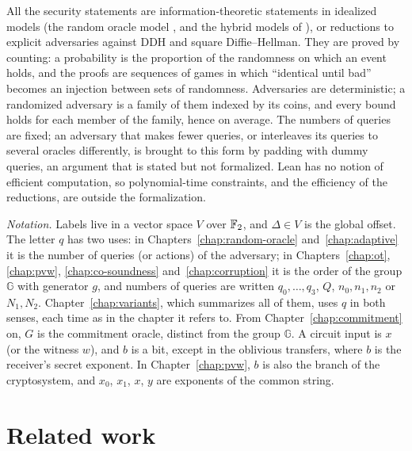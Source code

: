 All the security statements are information-theoretic statements in idealized models (the random
oracle model \cite{BR93}, and the hybrid models of \cite{JKO13}), or reductions to explicit
adversaries against DDH and square Diffie--Hellman. They are proved by counting: a probability is
the proportion of the randomness on which an event holds, and the proofs are sequences of games
\cite{Sho04} in which ``identical until bad'' \cite{BR06} becomes an injection between sets of
randomness. Adversaries are deterministic; a randomized adversary is a family of them indexed by
its coins, and every bound holds for each member of the family, hence on average. The numbers of
queries are fixed; an adversary that makes fewer queries, or interleaves its queries to several
oracles differently, is brought to this form by padding with dummy queries, an argument that is
stated but not formalized. Lean has no notion of efficient computation, so polynomial-time
constraints, and the efficiency of the reductions, are outside the formalization.

\emph{Notation.} Labels live in a vector space $V$ over $\mathbb{F}_2$, and $\Delta \in V$ is the global
offset. The letter $q$ has two uses: in Chapters~\ref{chap:random-oracle} and~\ref{chap:adaptive}
it is the number of queries (or actions) of the adversary; in Chapters~\ref{chap:ot},
\ref{chap:pvw}, \ref{chap:co-soundness} and~\ref{chap:corruption} it is the order of the group
$\mathbb{G}$ with generator $g$, and numbers of queries are written $q_0, \dots, q_3$, $Q$,
$n_0, n_1, n_2$ or $N_1, N_2$.
Chapter~\ref{chap:variants}, which summarizes all of them, uses $q$ in both senses, each time as
in the chapter it refers to. From
Chapter~\ref{chap:commitment} on, $G$ is the commitment oracle, distinct from the group
$\mathbb{G}$. A
circuit input is $x$ (or the witness $w$), and $b$ is a bit, except in the oblivious transfers,
where $b$ is the receiver's secret exponent. In Chapter~\ref{chap:pvw}, $b$ is also the branch of
the cryptosystem, and $x_0$, $x_1$, $x$, $y$ are exponents of the common string.

\section*{Related work}

